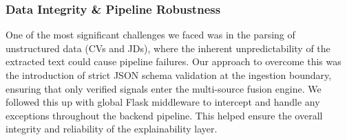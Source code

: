 \subsubsection{Data Integrity \& Pipeline Robustness}
One of the most significant challenges we faced was in the parsing of unstructured data (CVs and JDs),
where the inherent unpredictability of the extracted text could cause pipeline failures.
Our approach to overcome this was the introduction of strict JSON schema validation at the ingestion boundary, ensuring
that only verified signals enter the multi-source fusion engine. We followed this up with global Flask middleware to
intercept and handle any exceptions throughout the backend pipeline. This helped ensure the overall integrity and reliability
of the explainability layer.
